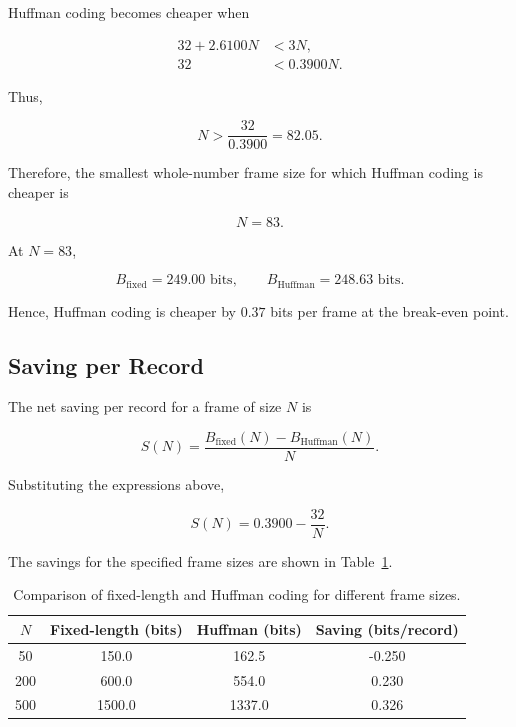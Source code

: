 \documentclass[11pt,a4paper]{article}
\begin{document}
Huffman coding becomes cheaper when

\begin{align}
    32 + 2.6100N &< 3N,\\
    32 &< 0.3900N.
\end{align}

Thus,

\begin{equation}
    N > \frac{32}{0.3900}
    = 82.05.
\end{equation}

Therefore, the smallest whole-number frame size for which Huffman
coding is cheaper is

\begin{equation}
    \boxed{N=83}.
\end{equation}

At \(N=83\),

\[
B_{\mathrm{fixed}}=249.00\text{ bits},
\qquad
B_{\mathrm{Huffman}}=248.63\text{ bits}.
\]

Hence, Huffman coding is cheaper by \(0.37\) bits per frame at the
break-even point.

\subsection{Saving per Record}

The net saving per record for a frame of size \(N\) is

\begin{equation}
    S(N)
    = \frac{B_{\mathrm{fixed}}(N)-B_{\mathrm{Huffman}}(N)}{N}.
\end{equation}

Substituting the expressions above,

\begin{equation}
    S(N)
    = 0.3900-\frac{32}{N}.
\end{equation}

The savings for the specified frame sizes are shown in
Table~\ref{tab:frame_savings}.

\begin{table}[H]
    \centering
    \caption{Comparison of fixed-length and Huffman coding for different frame sizes.}
    \label{tab:frame_savings}
    \begin{tabular}{cccc}
        \toprule
        \(N\) & Fixed-length (bits) & Huffman (bits) &
        Saving (bits/record) \\
        \midrule
        50  & 150.0  & 162.5  & -0.250 \\
        200 & 600.0  & 554.0  & 0.230 \\
        500 & 1500.0 & 1337.0 & 0.326 \\
        \bottomrule
    \end{tabular}
\end{table}
\end{document}
